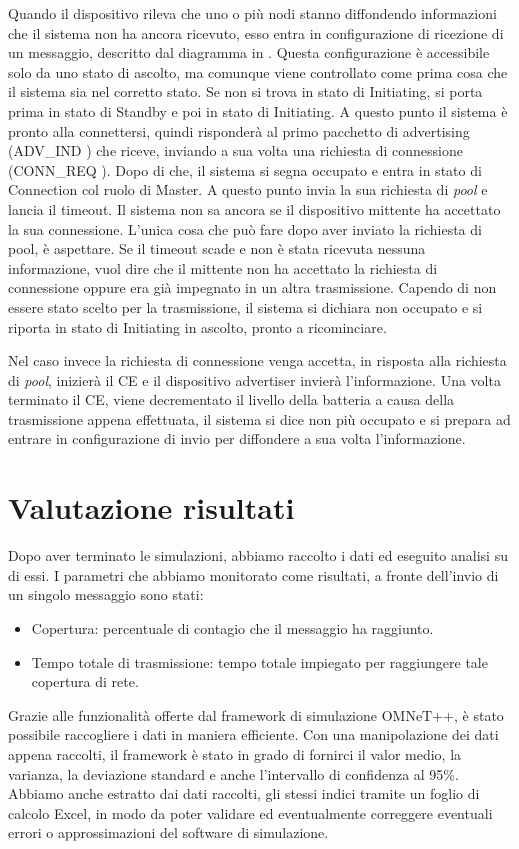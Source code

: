 Quando il dispositivo rileva che uno o più nodi stanno diffondendo informazioni che il sistema non ha ancora ricevuto, esso entra in configurazione di ricezione di un messaggio, descritto dal diagramma in . Questa configurazione è accessibile solo da uno stato di ascolto, ma comunque viene controllato come prima cosa che il sistema sia nel corretto stato. Se non si trova in stato di Initiating, si porta prima in stato di Standby e poi in stato di Initiating. A questo punto il sistema è pronto alla connettersi, quindi risponderà al primo pacchetto di advertising (ADV\_IND \cite{BT-CoreSpec4.0}) che riceve, inviando a sua volta una richiesta di connessione (CONN\_REQ \cite{BT-CoreSpec4.0}). Dopo di che, il sistema si segna occupato e entra in stato di Connection col ruolo di Master. A questo punto invia la sua richiesta di \textit{pool} e lancia il timeout. Il sistema non sa ancora se il dispositivo mittente ha accettato la sua connessione. L'unica cosa che può fare dopo aver inviato la richiesta di pool, è aspettare. Se il timeout scade e non è stata ricevuta nessuna informazione, vuol dire che il mittente non ha accettato la richiesta di connessione oppure era già impegnato in un altra trasmissione. Capendo di non essere stato scelto per la trasmissione, il sistema si dichiara non occupato e si riporta in stato di Initiating in ascolto, pronto a ricominciare.

Nel caso invece la richiesta di connessione venga accetta, in risposta alla richiesta di \textit{pool}, inizierà il \acs{CE} e il dispositivo advertiser invierà l'informazione. Una volta terminato il \acs{CE}, viene decrementato il livello della batteria a causa della trasmissione appena effettuata, il sistema si dice non più occupato e si prepara ad entrare in configurazione di invio per diffondere a sua volta l'informazione.
\bigskip

\section{Valutazione risultati}
Dopo aver terminato le simulazioni, abbiamo raccolto i dati ed eseguito analisi su di essi. I parametri che abbiamo monitorato come risultati, a fronte dell'invio di un singolo messaggio sono stati:
\begin{itemize}
	\item Copertura: percentuale di contagio che il messaggio ha raggiunto.
	\item Tempo totale di trasmissione: tempo totale impiegato per raggiungere tale copertura di rete.
\end{itemize}
Grazie alle funzionalità offerte dal framework di simulazione OMNeT++, è stato possibile raccogliere i dati in maniera efficiente. Con una manipolazione dei dati appena raccolti, il framework è stato in grado di fornirci il valor medio, la varianza, la deviazione standard e anche l'intervallo di confidenza al 95\%. Abbiamo anche estratto dai dati raccolti, gli stessi indici tramite un foglio di calcolo Excel, in modo da poter validare ed eventualmente correggere eventuali errori o approssimazioni del software di simulazione.

